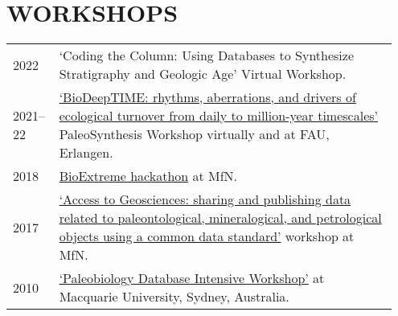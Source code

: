 \documentclass[11pt, a4paper]{article}
\begin{document}
\section{WORKSHOPS}
\begin{longtable}{@{}p{0.1\linewidth} P{0.85\linewidth}@{}}
2022 & `Coding the Column: Using Databases to Synthesize Stratigraphy and Geologic Age' Virtual Workshop.\\
2021--22 & \href{https://www.paleosynthesis.nat.fau.de/index.php/biodeeptime/}{`BioDeepTIME: rhythms, aberrations, and drivers of ecological turnover from daily to million-year timescales'} PaleoSynthesis Workshop virtually and at FAU, Erlangen.\\
2018 & \href{https://github.com/macroecology/BioExtremes}{BioExtreme hackathon} at MfN.\\
2017 & \href{https://abcd.biowikifarm.net/wiki/Events:WorkshopEFG2017}{`Access to Geosciences: sharing and publishing data related to paleontological, mineralogical, and petrological objects using a common data standard'} workshop at MfN.\\
2010 & \href{http://fossilworks.org/?page=workshop}{`Paleobiology Database Intensive Workshop'} at Macquarie University, Sydney, Australia.\\
\end{longtable}
\end{document}
